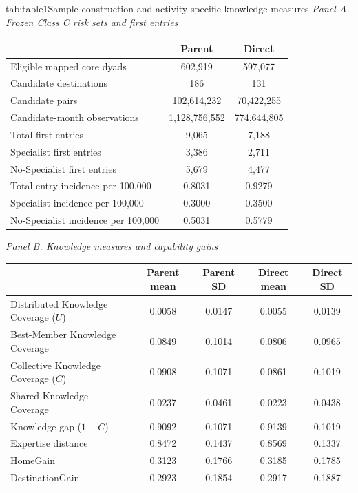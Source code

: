 \begin{regressiontable}{tab:table1}{Sample construction and activity-specific knowledge measures}
\noindent\textit{Panel A. Frozen Class C risk sets and first entries}\par\vspace{3pt}
\noindent\begin{tabular*}{\linewidth}{@{\extracolsep{\fill}}lcc@{}}
\toprule
 & Parent & Direct \\
\midrule
Eligible mapped core dyads & 602,919 & 597,077 \\
Candidate destinations & 186 & 131 \\
Candidate pairs & 102,614,232 & 70,422,255 \\
Candidate-month observations & 1,128,756,552 & 774,644,805 \\
Total first entries & 9,065 & 7,188 \\
Specialist first entries & 3,386 & 2,711 \\
No-Specialist first entries & 5,679 & 4,477 \\
Total entry incidence per 100,000 & 0.8031 & 0.9279 \\
Specialist incidence per 100,000 & 0.3000 & 0.3500 \\
No-Specialist incidence per 100,000 & 0.5031 & 0.5779 \\
\bottomrule
\end{tabular*}\par
\vspace{9pt}
\noindent\textit{Panel B. Knowledge measures and capability gains}\par\vspace{3pt}
\noindent\begin{tabular*}{\linewidth}{@{\extracolsep{\fill}}lcccc@{}}
\toprule
 & Parent mean & Parent SD & Direct mean & Direct SD \\
\midrule
Distributed Knowledge Coverage ($U$) & 0.0058 & 0.0147 & 0.0055 & 0.0139 \\
Best-Member Knowledge Coverage & 0.0849 & 0.1014 & 0.0806 & 0.0965 \\
Collective Knowledge Coverage ($C$) & 0.0908 & 0.1071 & 0.0861 & 0.1019 \\
Shared Knowledge Coverage & 0.0237 & 0.0461 & 0.0223 & 0.0438 \\
Knowledge gap ($1-C$) & 0.9092 & 0.1071 & 0.9139 & 0.1019 \\
Expertise distance & 0.8472 & 0.1437 & 0.8569 & 0.1337 \\
HomeGain & 0.3123 & 0.1766 & 0.3185 & 0.1785 \\
DestinationGain & 0.2923 & 0.1854 & 0.2917 & 0.1887 \\
\bottomrule
\end{tabular*}\par
{}
\end{regressiontable}
